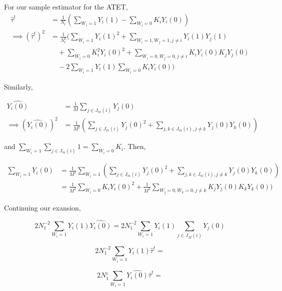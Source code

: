 \documentclass{article}
\newcommand{\hta}{\hat \tau^{t}}
\begin{document}
For our sample estimator for the ATET,
\begin{align*} \hat \tau^{t} &= \frac{1}{N_{t}}\left(\sum_{W_{i}=1}Y_{i}(1) - \sum_{W_{i}=0}K_{i}Y_{i}(0)\right) \\
\implies (\hat \tau^{t})^{2} &= \frac{1}{N_{t}^{2}}(\sum_{W_{i}=1}Y_{i}(1)^{2}+\sum_{W_{i}=1,W_{j} = 1, j \neq i}Y_{i}(1)Y_{j}(1) \\
&\quad+\sum_{W_{i}=0}K_{i}^{2}Y_{i}(0)^{2}+\sum_{W_{i}=0,W_{j}=0, j \neq i}K_{i}Y_{i}(0)K_{j}Y_{j}(0) \\
&\quad-2\sum_{W_{i}=1}Y_{i}(1)\sum_{W_{i}=0}K_{i}Y_{i}(0))\end{align*}

Similarly,

\begin{align*} \hat{Y_{i}(0)} &= \frac{1}{M}\sum_{j \in J_{m}(i)}Y_{j}(0) \\
\implies (\hat{Y_{i}(0)})^{2} &= \frac{1}{M^{2}}(\sum_{j \in J_{m}(i)}Y_{j}(0)^{2}+\sum_{j,k \in J_{m}(i), j \neq k}Y_{j}(0)Y_{k}(0))\end{align*}

and $\sum_{W_{i} = 1}\sum_{j \in J_{m}(i)}1 = \sum_{W_{i}=0}K_{i}$. Then,

\begin{align*} \sum_{W_{i} = 1}\hat{Y_{i}(0)} &= \frac{1}{M^{2}}\sum_{W_{i}=1}(\sum_{j \in J_{m}(i)}Y_{j}(0)^{2}+\sum_{j,k \in J_{m}(i), j \neq k}Y_{j}(0)Y_{k}(0)) \\
&=\frac{1}{M^{2}}\sum_{W_{i}=0}K_{i}Y_{i}(0)^{2}+\frac{1}{M^{2}}\sum_{W_{j}=0, W_{k} = 0, j \neq k}K_{j}Y_{j}(0)K_{k}Y_{k}(0))
\end{align*}

Continuing our exansion,

$$2N_{1}^{-2}\sum_{W_{i}=1}Y_{i}(1)\hat{Y_{i}(0)} = 2N_{1}^{-2}\sum_{W_{i}=1}Y_{i}(1)\sum_{j \in J_{M}(i)}Y_{j}(0)$$

$$2N_{1}^{-2}\sum_{W_{i}=1}Y_{i}(1)\hta = $$

$$2N_{1}^{_2}\sum_{W_{i}=1}\hat{Y_{i}(0)}\hta = $$
\end{document}
